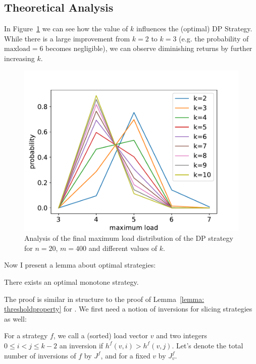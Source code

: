 \subsection{Theoretical Analysis}


In Figure~\ref{k-thinning-dp-maxload} we can see how the value of $k$ influences the (optimal) DP Strategy. While there is a large improvement from $k=2$ to $k=3$ (e.g. the probability of $\mathrm{maxload}=6$ becomes negligible), we can observe diminishing returns by further increasing $k$.


\begin{figure}[h]
    \centering
    \includegraphics[scale=0.6]{Chapter4/Figs/k_thinning_max_load_distribution_5_20.pdf}
    \caption{Analysis of the final maximum load distribution of the DP strategy for $n=20$, $m=400$ and different values of $k$.}
    \label{k-thinning-dp-maxload}
\end{figure}

Now I present a lemma about optimal strategies:

\begin{lemma} \label{lemma: k-thinning-monotone}
There exists an optimal monotone strategy.
\end{lemma}

The proof is similar in structure to the proof of Lemma~\ref{lemma: thresholdproperty} for \TwoThinning. We first need a notion of inversions for \KThinning slicing strategies as well:


\begin{definition} 
For a strategy $f$, we call a (sorted) load vector $v$ and two integers $0\leq i<j\leq k-2$ an inversion if $h^f(v,i)>h^f(v,j)$. Let's denote the total number of inversions of $f$ by $J^f$, and for a fixed $v$ by $J^f_v$.
\end{definition}


